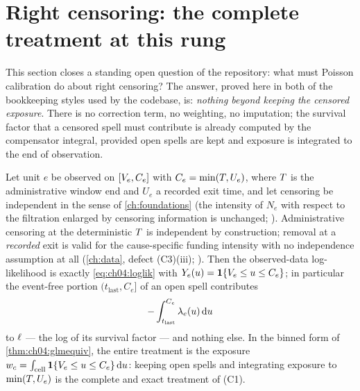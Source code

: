 \section{Right censoring: the complete treatment at this rung}\label{ch04:sec:censoring}

This section closes a standing open question of the repository: what must
Poisson calibration do about right censoring? The answer, proved here in
both of the bookkeeping styles used by the codebase, is: \emph{nothing
beyond keeping the censored exposure}. There is no correction term, no
weighting, no imputation; the survival factor that a censored spell must
contribute is already computed by the compensator integral, provided open
spells are kept and exposure is integrated to the end of observation.

\begin{proposition}\label{prop:ch04:censorexact}
Let unit $e$ be observed on $[V_e, C_e]$ with $C_e = \min(T,
U_e)$, where $T$ is the administrative window end and $U_e$ a recorded
exit time, and let censoring be independent in the sense of
\cref{ch:foundations} (the intensity of $N_e$ with respect to the
filtration enlarged by censoring information is unchanged;
\citealp[III.2]{abgk1993}). Administrative censoring at the deterministic
$T$ is independent by construction; removal at a \emph{recorded} exit
is valid for the cause-specific funding intensity with no independence
assumption at all (\cref{ch:data}, defect (C3)(iii);
\citealp{putter2007}). Then the observed-data log-likelihood is exactly
\cref{eq:ch04:loglik} with $Y_e(u) = \mathbf{1}\{V_e \le u \le C_e\}$;
in particular the event-free portion $(t_{\mathrm{last}}, C_e]$ of an open
spell contributes
\[
-\int_{t_{\mathrm{last}}}^{C_e} \lambda_e(u) \,\mathrm{d} u
\]
to $\ell$ --- the log of its survival factor --- and nothing else. In
the binned form of \cref{thm:ch04:glmequiv}, the entire treatment is the
exposure $w_c = \int_{\text{cell}} \mathbf{1}\{V_e \le u \le C_e\} \,\mathrm{d} u$:
keeping open spells and integrating exposure to $\min(T, U_e)$ is the
complete and exact treatment of (C1).
\end{proposition}

